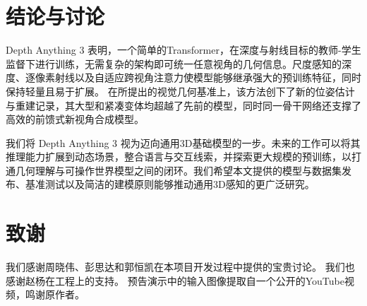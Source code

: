 \section{结论与讨论}

Depth Anything 3 表明，一个简单的Transformer，在深度与射线目标的教师-学生监督下进行训练，无需复杂的架构即可统一任意视角的几何信息。尺度感知的深度、逐像素射线以及自适应跨视角注意力使模型能够继承强大的预训练特征，同时保持轻量且易于扩展。
在所提出的视觉几何基准上，该方法创下了新的位姿估计与重建记录，其大型和紧凑变体均超越了先前的模型，同时同一骨干网络还支撑了高效的前馈式新视角合成模型。

我们将 Depth Anything 3 视为迈向通用3D基础模型的一步。未来的工作可以将其推理能力扩展到动态场景，整合语言与交互线索，并探索更大规模的预训练，以打通几何理解与可操作世界模型之间的闭环。我们希望本文提供的模型与数据集发布、基准测试以及简洁的建模原则能够推动通用3D感知的更广泛研究。

\section*{致谢}
我们感谢周晓伟、彭思达和郭恒凯在本项目开发过程中提供的宝贵讨论。
我们也感谢赵杨在工程上的支持。
预告演示中的输入图像提取自一个公开的YouTube视频\citep{mtsdrones2024}，鸣谢原作者。
